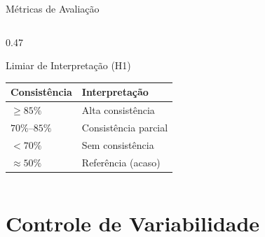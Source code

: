 \documentclass[aspectratio=169, 8pt]{beamer}
\begin{document}
\begin{frame}{Métricas de Avaliação}
\begin{columns}[T]
\begin{column}{0.47\textwidth}
      \begin{alertblock}{Limiar de Interpretação (H1)}
        \renewcommand{\arraystretch}{1.2}
        \begin{tabular}{ll}
          \toprule
          Consistência & Interpretação \\
          \midrule
          $\geq 85\%$ & Alta consistência \\
          $70\%$--$85\%$ & Consistência parcial \\
          $< 70\%$ & Sem consistência \\
          \midrule
          $\approx 50\%$ & Referência (acaso) \\
          \bottomrule
        \end{tabular}
      \end{alertblock}

    \end{column}
  \end{columns}
\end{frame}

\section{Controle de Variabilidade}
\end{document}
